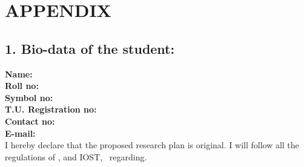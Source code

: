 \section*{\centering{} APPENDIX}

\subsection*{ 1. Bio-data of the student:}

\textbf{Name: } \myname
\\
\textbf{Roll no: }
\\
\textbf{Symbol no: } \sym
\\
\textbf{T.U. Registration no: } \reg
\\
\textbf{Contact no: }
\\
\textbf{E-mail: }
\\

\hspace{1cm} I \textbf{\myname} hereby declare that the proposed research plan
is original. I will follow all the regulations of \depart, \clz and IOST,
\tu\ regarding.







